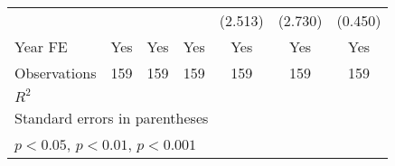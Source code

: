 \begin{table}[htbp]
\begin{tabular}{l*{6}{c}}
                &                  &                  &                  &  (2.513)         &  (2.730)         &  (0.450)         \\
\addlinespace
Year FE         &      Yes         &      Yes         &      Yes         &      Yes         &      Yes         &      Yes         \\
\midrule
Observations    &      159         &      159         &      159         &      159         &      159         &      159         \\
\(R^{2}\)       &                  &                  &                  &                  &                  &                  \\
\bottomrule
\multicolumn{7}{l}{\footnotesize Standard errors in parentheses}\\
\multicolumn{7}{l}{\footnotesize \sym{*} \(p<0.05\), \sym{**} \(p<0.01\), \sym{***} \(p<0.001\)}\\
\end{tabular}
\end{table}
